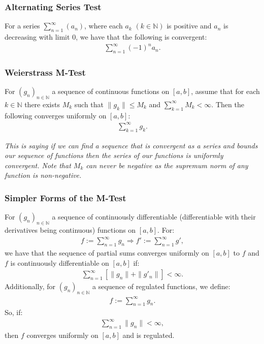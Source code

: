 \documentclass[a4paper, 12pt, twoside]{article}
\begin{document}
\subsubsection{Alternating Series Test}

For a series $\sum_{n = 1}^\infty(a_n)$, where each $a_k$ $(k\in\mathbb{N})$
is positive and $a_n$ is decreasing with limit $0$, we have that the following
is convergent:
\begin{align*}
      \sum_{n=1}^\infty(-1)^na_n.
\end{align*}

\subsubsection{Weierstrass M-Test}

For $(g_n)_{n\in\mathbb{N}}$ a sequence of continuous functions on $[a, b]$,
assume that for each $k\in\mathbb{N}$ there exists $M_k$ such that
$\|g_k\| \leq M_k$ and $\sum_{k = 1}^\infty M_k < \infty$. Then the following
converges uniformly on $[a, b]$:
\begin{align*}
      \sum_{k = 1}^\infty g_k.
\end{align*}

\textit{This is saying if we can find a sequence that is convergent as a series
      and bounds our sequence of functions then the series of our functions is
      uniformly convergent. Note that $M_k$ can never be negative as the
      supremum norm of any function is non-negative.}

\newpage

\subsubsection{Simpler Forms of the M-Test}

For $(g_n)_{n\in\mathbb{N}}$ a sequence of continuously differentiable (differentiable
with their derivatives being continuous) functions on $[a, b]$. For:
\begin{align*}
      f := \sum_{n = 1}^\infty g_n \Rightarrow f' := \sum_{n = 1}^\infty g',
\end{align*}
we have that the sequence of partial sums converges uniformly on $[a, b]$
to $f$ and $f$ is continuously differentiable on $[a, b]$ if:
\begin{align*}
      \sum_{n = 1}^\infty \left[\|g_n\| + \|g'_n\|\right] < \infty.
\end{align*}
Additionally, for $(g_n)_{n\in\mathbb{N}}$ a sequence of regulated functions,
we define:
\begin{align*}
      f := \sum_{n = 1}^\infty g_n.
\end{align*}
So, if:
\begin{align*}
      \sum_{n = 1}^\infty \|g_n\| < \infty,
\end{align*}
then $f$ converges uniformly on $[a, b]$ and is regulated.
\end{document}
